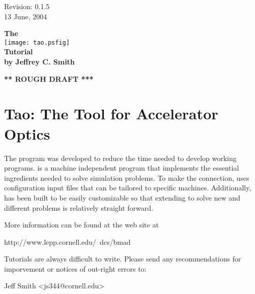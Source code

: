 \documentclass{report}
\begin{document}

\thispagestyle{empty}

\begin{flushright}
\large
  Revision: 0.1.5 \\
  13 June, 2004 \\
\end{flushright}

\vfill

{
\begin{center}
{\Huge \sf\bf The} \\
\vskip 0.1in
\texttt{[image: tao.psfig]} \\
\vskip 0.1in
{\Huge \sf\bf Tutorial} \\
\vskip 0.1in
{\normalsize \sf\bf by Jeffrey C. Smith} \\
\end{center}
}

\vskip 1in
\begin{center}
{\Huge \bf *** ROUGH DRAFT ***}
\end{center}
\vfill
\break

{
\setlength{\parskip}{\dPar}
\setlength{\parindent}{0ex}

\section*{Tao: The Tool for Accelerator Optics}

The \tao program was developed
to reduce the time needed to develop working programs. \tao is a
machine independent program that implements the essential ingredients
needed to solve simulation problems. To make the
connection, \tao uses configuration input files that can be tailored to
specific machines. Additionally, \tao has been built
to be easily customizable so that extending \tao to solve new and
different problems is relatively straight forward.

More information can be found at the \bmad web site at
\begin{example}
  http://www.lepp.cornell.edu/~dcs/bmad
\end{example}

Tutorials are always difficult to write. Please send any recommendations 
for imporvement or notices of out-right errors to:
\begin{example}
  Jeff Smith <js344@cornell.edu>
\end{example}
}
\end{document}
